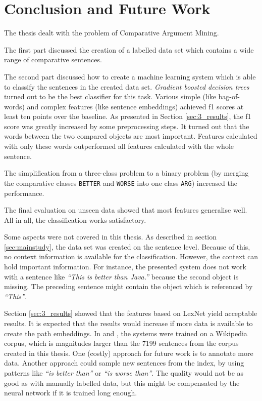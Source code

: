\chapter{Conclusion and Future Work}
The thesis dealt with the problem of Comparative Argument Mining. 

The first part discussed the creation of a labelled data set which contains a wide range of comparative sentences.

The second part discussed how to create a machine learning system which is able to classify the sentences in the created data set. \emph{Gradient boosted decision trees} turned out to be the best classifier for this task. Various simple (like bag-of-words) and complex features (like sentence embeddings) achieved f1 scores at least ten points over the baseline. As presented in Section \ref{sec:3_results}, the f1 score was greatly increased by some preprocessing steps. It turned out that the words between the two compared objects are most important. Features calculated with only these words outperformed all features calculated with the whole sentence.

The simplification from a three-class problem to a binary problem (by merging the comparative classes \texttt{BETTER} and \texttt{WORSE} into one class \texttt{ARG}) increased the performance.

The final evaluation on unseen data showed that most features generalise well. All in all, the classification works satisfactory.
\newline


Some aspects were not covered in this thesis. As described in section \ref{sec:mainstudy}, the data set was created on the sentence level. Because of this, no context information is available for the classification. However, the context can hold important information. For instance, the presented system does not work with a sentence like \emph{\enquote{This is better than Java.}} because the second object is missing. The preceding sentence might contain the object which is referenced by \emph{\enquote{This}}. 

Section \ref{sec:3_results} showed that the features based on LexNet yield acceptable results. It is expected that the results would increase if more data is available to create the path embeddings. In \cite{DBLP:conf/acl/ShwartzGD16} and \cite{DBLP:journals/corr/ShwartzD16}, the systems were trained on a Wikipedia corpus, which is magnitudes larger than the 7199 sentences from the corpus created in this thesis. One (costly) approach for future work is to annotate more data. Another approach could sample new sentences from the index, by using patterns like \emph{\enquote{is better than}} or \emph{\enquote{is worse than}}. The quality would not be as good as with manually labelled data, but this might be compensated by the neural network if it is trained long enough.

